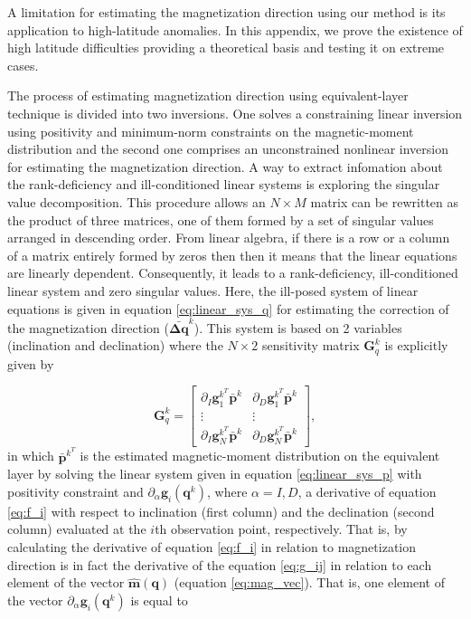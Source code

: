 \label{append:high-latitute}

A limitation for estimating the magnetization direction using our method is its application to high-latitude anomalies. In this appendix, we prove the existence of high latitude difficulties providing a theoretical basis and testing it on extreme cases.

The process of estimating magnetization direction using equivalent-layer technique is divided into two inversions. One solves a constraining linear inversion using positivity and minimum-norm constraints on the magnetic-moment distribution and the second one comprises an unconstrained nonlinear inversion for estimating the magnetization direction. A way to extract infomation about the rank-deficiency and ill-conditioned linear systems is exploring the singular value decomposition. This procedure allows an $N \times M$ matrix can be rewritten as the product of three matrices, one of them formed by a set of singular values arranged in descending order. From linear algebra, if there is a row or a column of a matrix entirely formed by zeros then then it means that the linear equations are linearly dependent. Consequently, it leads to a rank-deficiency, ill-conditioned linear system and zero singular values. Here, the ill-posed system of linear equations is given in equation \ref{eq:linear_sys_q} for estimating the correction of the magnetization direction ($\bar{\mathbf{\Delta q}}^{k}$). This system is based on 2 variables (inclination and declination) where the $N \times 2$ sensitivity matrix $\mathbf{G}_{q}^{k}$ is explicitly given by

\begin{equation}
\mathbf{G}_{q}^{k} =
\left[ \begin{array}{cc}
\partial_{I} \mathbf{g}_{1}^{k^T} \bar{\mathbf{p}}^{k}   & \partial_{D} \mathbf{g}_{1}^{k^T} \bar{\mathbf{p}}^{k} \\
\vdots & \vdots  \\
\partial_{I} \mathbf{g}_{N}^{k^T} \bar{\mathbf{p}}^{k}   & \partial_{D} \mathbf{g}_{N}^{k^T} \bar{\mathbf{p}}^{k} 
\end{array} \right] ,
\label{eq:gp}
\end{equation}
in which $\bar{\mathbf{p}}^{k^T}$ is the estimated magnetic-moment distribution on the equivalent layer by solving the linear system given in equation \ref{eq:linear_sys_p} with positivity constraint and $\partial_{\alpha}\mathbf{g}_{i} (\mathbf{q}^k)$, where $\alpha= I, D$, a derivative of equation \ref{eq:f_i} with respect to inclination (first column) and the declination (second column) evaluated at the $i$th observation point, respectively. That is, by calculating the derivative of equation \ref{eq:f_i} in relation to magnetization direction is in fact the derivative of the equation \ref{eq:g_ij} in relation to each element of the vector $\hat{\mathbf{m}}(\mathbf{q})$ (equation \ref{eq:mag_vec}). That is, one element of the vector $\partial_{\alpha}\mathbf{g}_{i} (\mathbf{q}^k)$ is equal to 



